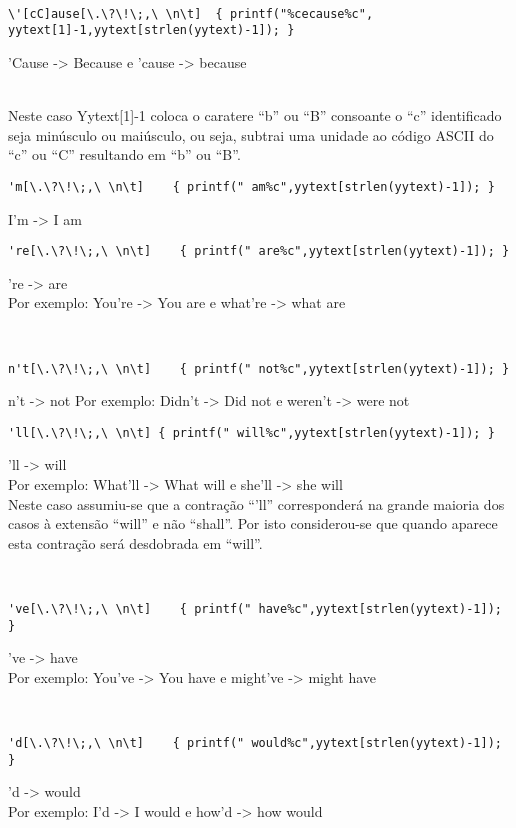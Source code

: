 \documentclass{report}
\begin{document}
\\
\begin{verbatim}
\'[cC]ause[\.\?\!\;,\ \n\t]  { printf("%cecause%c", yytext[1]-1,yytext[strlen(yytext)-1]); }
\end{verbatim}
'Cause -> Because
       e
'cause -> because

\\
Neste caso Yytext[1]-1 coloca o caratere “b” ou “B” consoante o “c” identificado seja minúsculo ou maiúsculo, ou seja, subtrai uma unidade ao código ASCII do “c” ou “C” resultando em “b” ou “B”.
\\
\begin{verbatim}
'm[\.\?\!\;,\ \n\t]    { printf(" am%c",yytext[strlen(yytext)-1]); }
\end{verbatim}
I’m -> I am
\\
\begin{verbatim}
're[\.\?\!\;,\ \n\t]    { printf(" are%c",yytext[strlen(yytext)-1]); }
\end{verbatim}
're -> are
\\
Por exemplo:
You're -> You are    e     what're -> what are

\\
\begin{verbatim}
n't[\.\?\!\;,\ \n\t]    { printf(" not%c",yytext[strlen(yytext)-1]); }
\end{verbatim}
n't -> not
Por exemplo:
Didn't -> Did not    e     weren't -> were not
\\
\begin{verbatim}
'll[\.\?\!\;,\ \n\t] { printf(" will%c",yytext[strlen(yytext)-1]); }
\end{verbatim}
'll -> will
\\
Por exemplo:
What'll -> What will    e     she'll -> she will
\\
Neste caso assumiu-se que a contração “'ll” corresponderá na grande maioria dos casos à extensão “will” e não “shall”. Por isto considerou-se que quando aparece esta contração será desdobrada em “will”.

\\
\begin{verbatim}
've[\.\?\!\;,\ \n\t]    { printf(" have%c",yytext[strlen(yytext)-1]); }
\end{verbatim}
've -> have
\\
Por exemplo:
You've -> You have    e     might've -> might have

\\
\begin{verbatim}
'd[\.\?\!\;,\ \n\t]    { printf(" would%c",yytext[strlen(yytext)-1]); }
\end{verbatim}
'd -> would
\\
Por exemplo:
I'd -> I would    e     how'd -> how would
\end{document}
